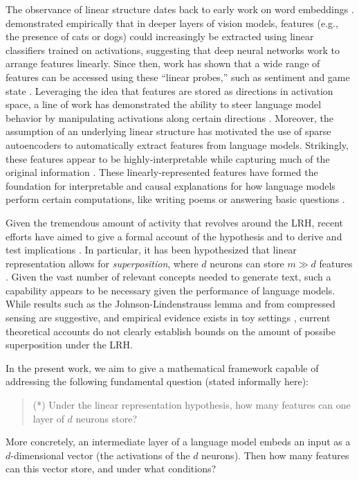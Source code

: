 \documentclass[11pt]{article}
\begin{document}
The observance of linear structure dates back to early work on word embeddings \citep{mikolov2013distributed, mikolov2013linguistic, arora2018linear}. \cite{alain2016understanding} demonstrated empirically that in deeper layers of vision models, features (e.g., the presence of cats or dogs) could increasingly be extracted using linear classifiers trained on activations, suggesting that deep neural networks work to arrange features linearly. Since then, work has shown that a wide range of features can be accessed using these ``linear probes,'' such as sentiment and game state \citep{nanda2023emergent, li2025language}. Leveraging the idea that features are stored as directions in activation space, a line of work has demonstrated the ability to steer language model behavior by manipulating activations along certain directions \citep{panickssery2023steering, zou2023representation, turner2023steering, wang2025persona, chen2025persona}. Moreover, the assumption of an underlying linear structure has motivated the use of sparse autoencoders to automatically extract features from language models. Strikingly, these features appear to be highly-interpretable while capturing much of the original information \citep{cunningham2023sparse, gao2024scaling, movva2025sparse}. These linearly-represented features have formed the foundation for interpretable and causal explanations for how language models perform certain computations, like writing poems or answering basic questions \citep{lindsey2025biology}.

Given the tremendous amount of activity that revolves around the LRH, recent efforts have aimed to give a formal account of the hypothesis and to derive and test implications \citep{elhage2022toy, park2023linear, costa2025flat}. In particular, it has been hypothesized that linear representation allows for \textit{superposition}, where $d$ neurons can store $m\gg d$ features \citep{elhage2022toy}. Given the vast number of relevant concepts needed to generate text, such a capability appears to be necessary given the performance of language models. While results such as the Johnson-Lindenstrauss lemma \citep{johnson1984extensions} and from compressed sensing \citep{candes2006near, candes2006robust, donoho2006compressed} are suggestive, and empirical evidence exists in toy settings \citep{elhage2022toy}, current theoretical accounts do not clearly establish bounds on the amount of possibe superposition under the LRH.



In the present work, we aim to give a mathematical framework capable of addressing the following fundamental question (stated informally here):
\begin{quote}
    (*) Under the linear representation hypothesis, how many features can one layer of $d$ neurons store?
\end{quote}
More concretely, an intermediate layer of a language model embeds an input as a $d$-dimensional vector (the activations of the $d$ neurons). Then how many features can this vector store, and under what conditions?
\end{document}
